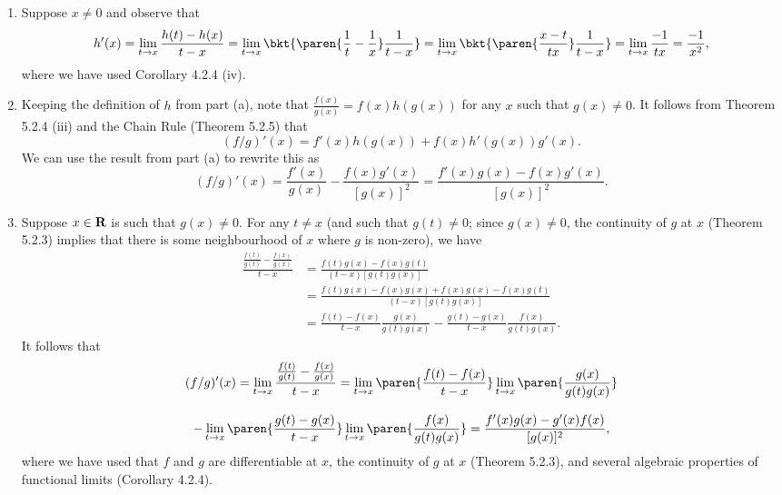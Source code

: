 \documentclass{lew98_solutions}
\begin{document}
\begin{solution}
    \begin{enumerate}
        \item Suppose \( x \neq 0 \) and observe that
        \[
            h'(x) = \lim_{t \to x} \frac{h(t) - h(x)}{t - x} = \lim_{t \to x} \bkt{ \paren{ \frac{1}{t} - \frac{1}{x} } \frac{1}{t - x} } = \lim_{t \to x} \bkt{ \paren{ \frac{x - t}{tx} } \frac{1}{t - x} } = \lim_{t \to x} \frac{-1}{tx} = \frac{-1}{x^2},
        \]
        where we have used Corollary 4.2.4 (iv).

        \item Keeping the definition of \( h \) from part (a), note that \( \tfrac{f(x)}{g(x)} = f(x) h(g(x)) \) for any \( x \) such that \( g(x) \neq 0 \). It follows from Theorem 5.2.4 (iii) and the Chain Rule (Theorem 5.2.5) that
        \[
            (f/g)'(x) = f'(x) h(g(x)) + f(x) h'(g(x)) g'(x).
        \]
        We can use the result from part (a) to rewrite this as
        \[
            (f/g)'(x) = \frac{f'(x)}{g(x)} - \frac{f(x) g'(x)}{[g(x)]^2} = \frac{f'(x) g(x) - f(x) g'(x)}{[g(x)]^2}.
        \]

        \item Suppose \( x \in \mathbf{R} \) is such that \( g(x) \neq 0 \). For any \( t \neq x \) (and such that \( g(t) \neq 0 \); since \( g(x) \neq 0 \), the continuity of \( g \) at \( x \) (Theorem 5.2.3) implies that there is some neighbourhood of \( x \) where \( g \) is non-zero), we have
        \begin{align*}
            \frac{\frac{f(t)}{g(t)} - \frac{f(x)}{g(x)}}{t - x} &= \frac{f(t)g(x) - f(x)g(t)}{(t - x)[g(t)g(x)]} \\[2mm]
            &= \frac{f(t)g(x) - f(x)g(x) + f(x)g(x) - f(x)g(t)}{(t - x)[g(t)g(x)]} \\[2mm]
            &= \frac{f(t) - f(x)}{t - x} \frac{g(x)}{g(t)g(x)} - \frac{g(t) - g(x)}{t - x} \frac{f(x)}{g(t)g(x)}.
        \end{align*}
        It follows that
        \begin{multline*}
            (f/g)'(x) = \lim_{t \to x} \frac{\frac{f(t)}{g(t)} - \frac{f(x)}{g(x)}}{t - x} = \lim_{t \to x} \paren{\frac{f(t) - f(x)}{t - x}} \lim_{t \to x} \paren{\frac{g(x)}{g(t)g(x)}} \\[3mm]
            - \lim_{t \to x} \paren{\frac{g(t) - g(x)}{t - x}} \lim_{t \to x} \paren{\frac{f(x)}{g(t)g(x)}} = \frac{f'(x) g(x) - g'(x) f(x)}{[g(x)]^2},
        \end{multline*}
        where we have used that \( f \) and \( g \) are differentiable at \( x \), the continuity of \( g \) at \( x \) (Theorem 5.2.3), and several algebraic properties of functional limits (Corollary 4.2.4).
    \end{enumerate}
\end{solution}
\end{document}
